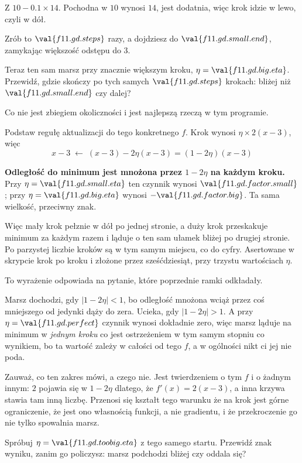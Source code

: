 \begin{fr}
Z $10 - \num{0.1} \times 14$. Pochodna w $10$ wynosi $14$, jest dodatnia, więc
krok idzie w lewo, czyli w dół.

Zrób to $\val{f11.gd.steps}$ razy, a dojdziesz do
$\val{f11.gd.small.end}$, zamykając większość odstępu do $3$.

Teraz ten sam marsz przy znacznie większym kroku, $\eta =
\val{f11.gd.big.eta}$. Przewidź, gdzie skończy po tych samych
$\val{f11.gd.steps}$ krokach: bliżej niż $\val{f11.gd.small.end}$ czy dalej?
\dotline
\nextframe
\end{fr}

\begin{fr}
Co nie jest zbiegiem okoliczności i jest najlepszą rzeczą w tym programie.

Podstaw regułę aktualizacji do tego konkretnego $f$. Krok wynosi
$\eta \times 2(x-3)$, więc
\[ x - 3 \;\longleftarrow\; (x - 3) - 2\eta(x - 3) = (1 - 2\eta)(x - 3) \]

\textbf{Odległość do minimum jest mnożona przez $1 - 2\eta$ na każdym kroku.}
Przy $\eta = \val{f11.gd.small.eta}$ ten czynnik wynosi
$\val{f11.gd.factor.small}$; przy $\eta = \val{f11.gd.big.eta}$ wynosi
$-\val{f11.gd.factor.big}$. Ta sama wielkość, przeciwny znak.

Więc mały krok pełznie w dół po jednej stronie, a duży krok przeskakuje
minimum za każdym razem i ląduje o ten sam ułamek bliżej po drugiej stronie.
Po parzystej liczbie kroków są w tym samym miejscu, co do cyfry. Asertowane w
skrypcie krok po kroku i złożone przez sześćdziesiąt, przy trzystu wartościach
$\eta$.
\end{fr}

\begin{fr}
To wyrażenie odpowiada na pytanie, które poprzednie ramki odkładały.

Marsz dochodzi, gdy $\lvert 1 - 2\eta \rvert < 1$, bo odległość mnożona wciąż
przez coś mniejszego od jedynki dąży do zera. Ucieka, gdy
$\lvert 1 - 2\eta \rvert > 1$. A przy $\eta = \val{f11.gd.perfect}$ czynnik
wynosi dokładnie zero, więc marsz ląduje na minimum w \emph{jednym kroku}
\dash{} co jest ostrzeżeniem w tym samym stopniu co wynikiem, bo ta wartość
zależy w całości od tego $f$, a w ogólności nikt ci jej nie poda.

Zauważ, co ten zakres mówi, a czego nie. Jest twierdzeniem o tym $f$ i o
żadnym innym: $2$ pojawia się w $1 - 2\eta$ dlatego, że $f'(x) = 2(x-3)$, a
inna krzywa stawia tam inną liczbę. Przenosi się kształt tego warunku \dash{}
że na krok jest górne ograniczenie, że jest ono własnością funkcji, a nie
gradientu, i że przekroczenie go nie tylko spowalnia marsz.

Spróbuj $\eta = \val{f11.gd.toobig.eta}$ z tego samego startu. Przewidź znak
wyniku, zanim go policzysz: marsz podchodzi bliżej czy oddala się?
\dotline
\nextframe
\end{fr}

